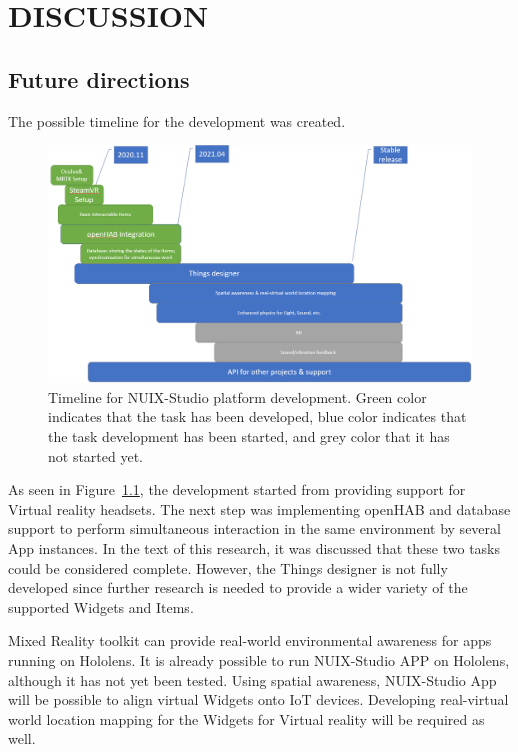 
\chapter{DISCUSSION}

\section{Future directions}

The possible timeline for the development was created.

\begin{figure}
  \centering
  \includegraphics[width=0.9\linewidth]{figures/Timeline.png}
  \caption{Timeline for NUIX-Studio platform development. Green color indicates that the task has been developed, blue color indicates that the task development has been started, and grey color that it has not started yet.}
  \label{fig:Timeline-figure}
\end{figure}

As seen in Figure~\ref{fig:Timeline-figure}, the development started from providing support for Virtual reality headsets. The next step was implementing openHAB and database support to perform simultaneous interaction in the same environment by several App instances. In the text of this research, it was discussed that these two tasks could be considered complete. However, the Things designer is not fully developed since further research is needed to provide a wider variety of the supported Widgets and Items.

Mixed Reality toolkit can provide real-world environmental awareness for apps running on Hololens. It is already possible to run NUIX-Studio APP on Hololens, although it has not yet been tested. Using spatial awareness, NUIX-Studio App will be possible to align virtual Widgets onto IoT devices. Developing real-virtual world location mapping for the Widgets for Virtual reality will be required as well.


